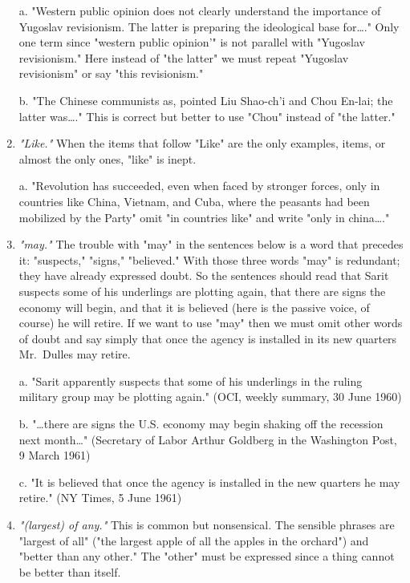 \documentclass[
    oneside,
    11pt,
    draft
]{memoir}
\begin{document}
\begin{enumerate}
  a. "Western public opinion does not clearly understand the importance of Yugoslav revisionism. The latter is preparing the ideological base for\dots."  Only one term since "western public opinion'" is not parallel with "Yugoslav revisionism." Here instead of "the latter" we must repeat "Yugoslav revisionism" or say "this revisionism." 
  
  b. "The Chinese communists as, pointed Liu Shao-ch'i and Chou En-lai; the latter was\dots." This is correct but better to use "Chou" instead of "the latter." 
  
  \item \emph{"Like."} When the items that follow "Like" are the only examples, items, or almost the only ones, "like" is inept. 
  
  a. "Revolution has succeeded, even when faced by stronger forces, only in countries like China, Vietnam, and Cuba, where the peasants had been mobilized by the Party" omit "in countries like" and write "only in china\dots." 
  
  \item \emph{"may."} The trouble with "may" in the sentences below is a word that precedes it: "suspects," "signs," "believed." With those three words "may" is redundant; they have already expressed doubt. So the sentences should read that Sarit suspects some of his underlings are plotting again, that there are signs the economy will begin, and that it is believed (here is the passive voice, of course) he will retire. If we want to use "may" then we must omit other words of doubt and say simply that once the agency is installed in its new quarters Mr.\ Dulles may retire.
  
  a. "Sarit apparently suspects that some of his underlings in the ruling military group may be plotting again." (OCI, weekly summary, 30 June 1960) 
  
  b. "\dots there are signs the U.S. economy may begin shaking off the recession next month\dots" (Secretary of Labor Arthur Goldberg in the Washington Post, 9 March 1961) 
  
  c. "It is believed that once the agency is installed in the new quarters he may retire." (NY Times, 5 June 1961) 
  
  \item \emph{"(largest) of any."} This is common but nonsensical. The sensible phrases are "largest of all" ("the largest apple of all the apples in the orchard") and "better than any other." The "other" must be expressed since a thing cannot be better than itself. 
  

\end{enumerate}
\end{document}
